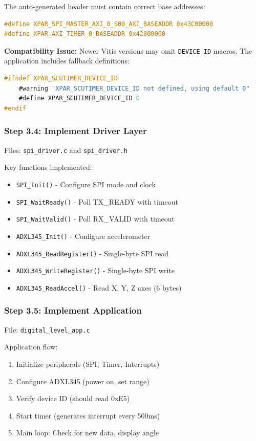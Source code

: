 \documentclass[11pt,a4paper]{article}
\begin{document}
The auto-generated header must contain correct base addresses:

\begin{lstlisting}[language=C, caption=Expected xparameters.h Content]
#define XPAR_SPI_MASTER_AXI_0_S00_AXI_BASEADDR 0x43C00000
#define XPAR_AXI_TIMER_0_BASEADDR 0x42800000
\end{lstlisting}

\textbf{Compatibility Issue:} Newer Vitis versions may omit \texttt{DEVICE\_ID} macros. The application includes fallback definitions:

\begin{lstlisting}[language=C, caption=Compatibility Layer]
#ifndef XPAR_SCUTIMER_DEVICE_ID
    #warning "XPAR_SCUTIMER_DEVICE_ID not defined, using default 0"
    #define XPAR_SCUTIMER_DEVICE_ID 0
#endif
\end{lstlisting}

\subsubsection{Step 3.4: Implement Driver Layer}

Files: \texttt{spi\_driver.c} and \texttt{spi\_driver.h}

Key functions implemented:
\begin{itemize}
    \item \texttt{SPI\_Init()} - Configure SPI mode and clock
    \item \texttt{SPI\_WaitReady()} - Poll TX\_READY with timeout
    \item \texttt{SPI\_WaitValid()} - Poll RX\_VALID with timeout
    \item \texttt{ADXL345\_Init()} - Configure accelerometer
    \item \texttt{ADXL345\_ReadRegister()} - Single-byte SPI read
    \item \texttt{ADXL345\_WriteRegister()} - Single-byte SPI write
    \item \texttt{ADXL345\_ReadAccel()} - Read X, Y, Z axes (6 bytes)
\end{itemize}

\subsubsection{Step 3.5: Implement Application}

File: \texttt{digital\_level\_app.c}

Application flow:
\begin{enumerate}
    \item Initialize peripherals (SPI, Timer, Interrupts)
    \item Configure ADXL345 (power on, set range)
    \item Verify device ID (should read 0xE5)
    \item Start timer (generates interrupt every 500ms)
    \item Main loop: Check for new data, display angle
\end{enumerate}
\end{document}

